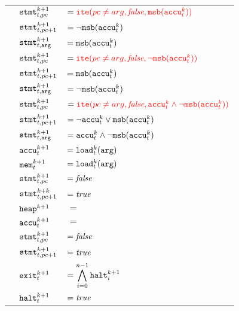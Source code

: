 \begin{longtabu}{llX[m]}
  \hline
    & $\texttt{stmt}^{k + 1}_{t, pc}$           & $= {\color{red}\texttt{ite}(pc \neq arg, \textit{false}, \texttt{msb}(\texttt{accu}^k_t))}$ \\
    & $\texttt{stmt}^{k + 1}_{t, pc + 1}$       & $= \lnot \texttt{msb}(\texttt{accu}^k_t)$ \\
    & $\texttt{stmt}^{k + 1}_{t, \texttt{arg}}$ & $= \texttt{msb}(\texttt{accu}^k_t)$ \\
  \hline
  \newpage
  \hline
    & $\texttt{stmt}^{k + 1}_{t, pc}$           & $= {\color{red}\texttt{ite}(pc \neq arg, \textit{false}, \lnot \texttt{msb}(\texttt{accu}^k_t))}$ \\
    & $\texttt{stmt}^{k + 1}_{t, pc + 1}$       & $= \texttt{msb}(\texttt{accu}^k_t)$ \\
    & $\texttt{stmt}^{k + 1}_{t, \texttt{arg}}$ & $= \lnot \texttt{msb}(\texttt{accu}^k_t)$ \\
  \hline
    & $\texttt{stmt}^{k + 1}_{t, pc}$           & $= {\color{red}\texttt{ite}(pc \neq arg, \textit{false}, \texttt{accu}^k_t \land \lnot \texttt{msb}(\texttt{accu}^k_t))}$ \\
    & $\texttt{stmt}^{k + 1}_{t, pc + 1}$       & $= \lnot \texttt{accu}^k_t \lor \texttt{msb}(\texttt{accu}^k_t)$ \\
    & $\texttt{stmt}^{k + 1}_{t, \texttt{arg}}$ & $= \texttt{accu}^k_t \land \lnot \texttt{msb}(\texttt{accu}^k_t)$ \\
  \hline
    & $\texttt{accu}^{k + 1}_t$           & $= \texttt{load}^k_t(\texttt{arg})$ \\
    & $\texttt{mem}^{k + 1}_t$            & $= \texttt{load}^k_t(\texttt{arg})$ \\
    & $\texttt{stmt}^{k + 1}_{t, pc}$     & $= \textit{false}$ \\
    & $\texttt{stmt}^{k + k}_{t, pc + 1}$ & $= \textit{true}$ \\
  \hline
    & $\texttt{heap}^{k + 1}$             & $=$ \usebox{\CASHEAPAXIOM} \\
    & $\texttt{accu}^{k + 1}_t$           & $=$ \usebox{\CASACCUAXIOM} \\
    & $\texttt{stmt}^{k + 1}_{t, pc}$     & $= \textit{false}$ \\
    & $\texttt{stmt}^{k + 1}_{t, pc + 1}$ & $= \textit{true}$ \\
  \hline
    & $\texttt{exit}^{k + 1}_t$       & $= \displaystyle \bigwedge^{n - 1}_{i = 0} \texttt{halt}^{k + 1}_i$ \\
    & $\texttt{halt}^{k + 1}_t$       & $= \textit{true}$ \\

\end{longtabu}
